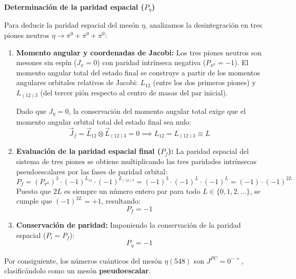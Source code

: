 \begin{problema}
\textbf{Determinación de la paridad espacial ($P_\eta$)}

Para deducir la paridad espacial del mesón $\eta$, analizamos la desintegración en tres piones neutros $\eta \to \pi^0 + \pi^0 + \pi^0$:
\begin{enumerate}[label=\arabic*.]
    \item \textbf{Momento angular y coordenadas de Jacobi:}
    Los tres piones neutros son mesones sin espín ($J_\pi = 0$) con paridad intrínseca negativa ($P_{\pi^0} = -1$). El momento angular total del estado final se construye a partir de los momentos angulares orbitales relativos de Jacobi: $L_{12}$ (entre los dos primeros piones) y $L_{(12)3}$ (del tercer pión respecto al centro de masas del par inicial).
    
    Dado que $J_\eta = 0$, la conservación del momento angular total exige que el momento angular orbital total del estado final sea nulo:
    \begin{equation*}
        \vec{J}_f = \vec{L}_{12} \otimes \vec{L}_{(12)3} = 0 \implies L_{12} = L_{(12)3} \equiv L
    \end{equation*}

    \item \textbf{Evaluación de la paridad espacial final ($P_f$):}
    La paridad espacial del sistema de tres piones se obtiene multiplicando las tres paridades intrínsecas pseudoescalares por las fases de paridad orbital:
    \begin{equation*}
        P_f = (P_{\pi^0})^3 \cdot (-1)^{L_{12}} \cdot (-1)^{L_{(12)3}} = (-1)^3 \cdot (-1)^L \cdot (-1)^L = (-1) \cdot (-1)^{2L}
    \end{equation*}
    Puesto que $2L$ es siempre un número entero par para todo $L \in \{0, 1, 2, \dots\}$, se cumple que $(-1)^{2L} = +1$, resultando:
    \begin{equation*}
        P_f = -1
    \end{equation*}

    \item \textbf{Conservación de paridad:}
    Imponiendo la conservación de la paridad espacial ($P_i = P_f$):
    \begin{equation*}
        P_\eta = -1
    \end{equation*}
\end{enumerate}

Por consiguiente, los números cuánticos del mesón $\eta(548)$ son $J^{PC} = 0^{-+}$, clasificándolo como un mesón \textbf{pseudoescalar}.


\end{problema}
